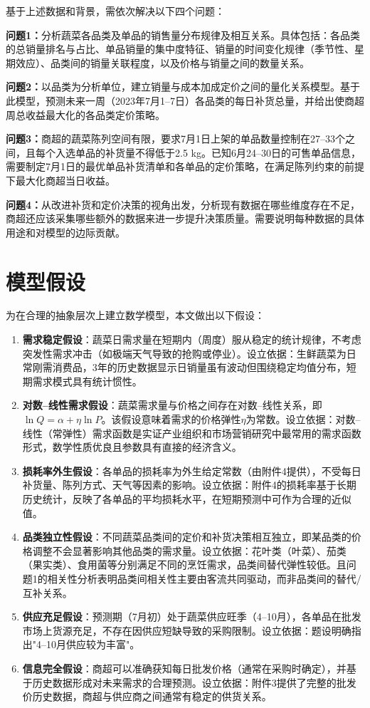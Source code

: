 \documentclass[12pt,a4paper]{ctexart}
\begin{document}
基于上述数据和背景，需依次解决以下四个问题：

\textbf{问题1：}分析蔬菜各品类及单品的销售量分布规律及相互关系。具体包括：各品类的总销量排名与占比、单品销量的集中度特征、销量的时间变化规律（季节性、星期效应）、品类间的销量关联程度，以及价格与销量之间的数量关系。

\textbf{问题2：}以品类为分析单位，建立销量与成本加成定价之间的量化关系模型。基于此模型，预测未来一周（2023年7月1--7日）各品类的每日补货总量，并给出使商超周总收益最大化的各品类定价策略。

\textbf{问题3：}商超的蔬菜陈列空间有限，要求7月1日上架的单品数量控制在27--33个之间，且每个入选单品的补货量不得低于2.5 kg。已知6月24--30日的可售单品信息，需要制定7月1日的最优单品补货清单和各单品的定价策略，在满足陈列约束的前提下最大化商超当日收益。

\textbf{问题4：}从改进补货和定价决策的视角出发，分析现有数据在哪些维度存在不足，商超还应该采集哪些额外的数据来进一步提升决策质量。需要说明每种数据的具体用途和对模型的边际贡献。

\section{模型假设}

为在合理的抽象层次上建立数学模型，本文做出以下假设：

\begin{enumerate}[label=(\arabic*), leftmargin=*]
    \item \textbf{需求稳定假设}：蔬菜日需求量在短期内（周度）服从稳定的统计规律，不考虑突发性需求冲击（如极端天气导致的抢购或停业）。设立依据：生鲜蔬菜为日常刚需消费品，3年的历史数据显示日销量虽有波动但围绕稳定均值分布，短期需求模式具有统计惯性。
    \item \textbf{对数--线性需求假设}：蔬菜需求量与价格之间存在对数--线性关系，即$\ln Q = \alpha + \eta \ln P$。该假设意味着需求的价格弹性$\eta$为常数。设立依据：对数--线性（常弹性）需求函数是实证产业组织和市场营销研究中最常用的需求函数形式，数学性质优良且参数具有直接的经济含义。
    \item \textbf{损耗率外生假设}：各单品的损耗率为外生给定常数（由附件4提供），不受每日补货量、陈列方式、天气等因素的影响。设立依据：附件4的损耗率基于长期历史统计，反映了各单品的平均损耗水平，在短期预测中可作为合理的近似值。
    \item \textbf{品类独立性假设}：不同蔬菜品类间的定价和补货决策相互独立，即某品类的价格调整不会显著影响其他品类的需求量。设立依据：花叶类（叶菜）、茄类（果实类）、食用菌等分别满足不同的烹饪需求，品类间替代弹性较低。且问题1的相关性分析表明品类间相关性主要由客流共同驱动，而非品类间的替代/互补关系。
    \item \textbf{供应充足假设}：预测期（7月初）处于蔬菜供应旺季（4--10月），各单品在批发市场上货源充足，不存在因供应短缺导致的采购限制。设立依据：题设明确指出"4--10月供应较为丰富"。
    \item \textbf{信息完全假设}：商超可以准确获知每日批发价格（通常在采购时确定），并基于历史数据形成对未来需求的合理预测。设立依据：附件3提供了完整的批发价历史数据，商超与供应商之间通常有稳定的供货关系。
\end{enumerate}
\end{document}
